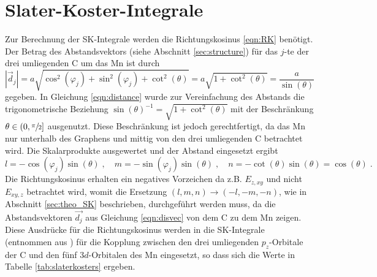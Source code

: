 \section{Slater-Koster-Integrale}
\label{sec:slaterkostercalc}
Zur Berechnung der SK-Integrale werden die Richtungskosinus \eqref{eqn:RK} benötigt.
Der Betrag des Abstandsvektors (siehe Abschnitt \ref{sec:structure}) für das $j$-te der drei umliegenden C um das Mn ist durch 
\begin{equation}
    \left | \vec{d}_j  \right | = a \sqrt{\cos^2(\varphi_j) + \sin^2(\varphi_j) + \cot^2(\theta)} = a \sqrt{1+\cot^2(\theta)} = \frac{a}{\sin(\theta)} \label{eqn:distance}
\end{equation}
gegeben.
In Gleichung \eqref{eqn:distance} wurde zur Vereinfachung des Abstands die trigonometrische Beziehung $ \sin(\theta)^{-1} = \sqrt{1+\cot^2(\theta)}$ \cite{trig} mit der Beschränkung
$\theta \in ( 0, \sfrac{\pi}{2} ] $ ausgenutzt. 
Diese Beschränkung ist jedoch gerechtfertigt, da das Mn nur unterhalb des Graphens und mittig von den drei umliegenden C betrachtet wird.
Die Skalarprodukte ausgewertet und der Abstand eingesetzt ergibt
\begin{equation*}
    l = -\cos(\varphi_j) \sin(\theta) \; , \quad
    m = -\sin(\varphi_j) \sin(\theta) \; , \quad
    n = -\cot(\theta) \sin(\theta) = \cos(\theta) \; .
\end{equation*}
Die Richtungskosinus erhalten ein negatives Vorzeichen da z.B. $E_{z,xy}$ und nicht $E_{xy,z}$ betrachtet wird, womit die Ersetzung 
$(l,m,n) \to (-l,-m,-n)$, wie in Abschnitt \ref{sec:theo_SK} beschrieben, durchgeführt werden muss, da die Abstandsvektoren $\vec{d_j}$ aus Gleichung \eqref{eqn:disvec} von 
dem C zu dem Mn zeigen.
Diese Ausdrücke für die Richtungskosinus werden in die SK-Integrale (entnommen aus \cite{PhysRev.94.1498}) für die Kopplung zwischen den drei umliegenden 
$p_z$-Orbitale der C und den fünf $3d$-Orbitalen des Mn eingesetzt,
so dass sich die Werte in Tabelle \ref{tab:slaterkosters} ergeben.
